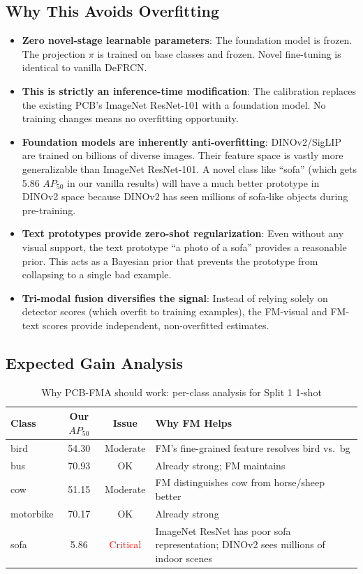 \documentclass[11pt,a4paper]{article}
\begin{document}
\subsection{Why This Avoids Overfitting}

\begin{itemize}[nosep]
    \item \textbf{Zero novel-stage learnable parameters}: The foundation model is frozen. The projection $\pi$ is trained on base classes and frozen. Novel fine-tuning is identical to vanilla DeFRCN.
    \item \textbf{This is strictly an inference-time modification}: The calibration replaces the existing PCB's ImageNet ResNet-101 with a foundation model. No training changes means no overfitting opportunity.
    \item \textbf{Foundation models are inherently anti-overfitting}: DINOv2/SigLIP are trained on billions of diverse images. Their feature space is vastly more generalizable than ImageNet ResNet-101. A novel class like ``sofa'' (which gets 5.86 $AP_{50}$ in our vanilla results) will have a much better prototype in DINOv2 space because DINOv2 has seen millions of sofa-like objects during pre-training.
    \item \textbf{Text prototypes provide zero-shot regularization}: Even without any visual support, the text prototype ``a photo of a sofa'' provides a reasonable prior. This acts as a Bayesian prior that prevents the prototype from collapsing to a single bad example.
    \item \textbf{Tri-modal fusion diversifies the signal}: Instead of relying solely on detector scores (which overfit to training examples), the FM-visual and FM-text scores provide independent, non-overfitted estimates.
\end{itemize}

\subsection{Expected Gain Analysis}

\begin{table}[h]
\centering
\caption{Why PCB-FMA should work: per-class analysis for Split 1 1-shot}
\small
\begin{tabular}{lccp{5cm}}
\toprule
\textbf{Class} & \textbf{Our $AP_{50}$} & \textbf{Issue} & \textbf{Why FM Helps} \\
\midrule
bird & 54.30 & Moderate & FM's fine-grained feature resolves bird vs.\ bg \\
bus & 70.93 & OK & Already strong; FM maintains \\
cow & 51.15 & Moderate & FM distinguishes cow from horse/sheep better \\
motorbike & 70.17 & OK & Already strong \\
sofa & 5.86 & \textcolor{red}{Critical} & ImageNet ResNet has poor sofa representation; DINOv2 sees millions of indoor scenes \\
\bottomrule
\end{tabular}
\end{table}
\end{document}
